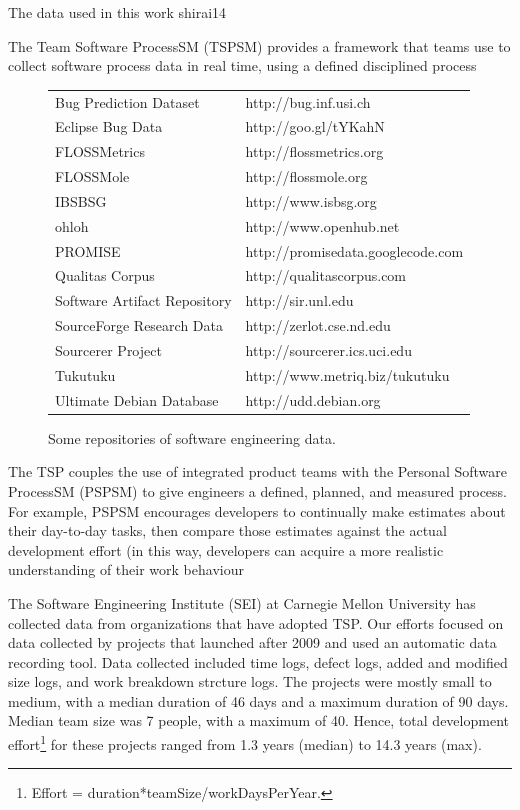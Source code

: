 \documentclass{sig-alternate}
\begin{document}
The data used in this work shirai14

The Team Software ProcessSM (TSPSM) provides a
framework that teams use to collect software process data in real
time, using a defined disciplined process


\begin{figure}
\begin{center}
\scriptsize\begin{tabular}{|l@{~:~}l|}\hline
Bug Prediction Dataset &http://bug.inf.usi.ch \\
Eclipse Bug Data &http://goo.gl/tYKahN \\
FLOSSMetrics& http://flossmetrics.org \\
FLOSSMole &http://flossmole.org \\
IBSBSG& http://www.isbsg.org \\
ohloh& http://www.openhub.net \\
PROMISE &http://promisedata.googlecode.com \\
Qualitas Corpus &http://qualitascorpus.com \\
Software Artifact Repository &http://sir.unl.edu \\
SourceForge Research Data &http://zerlot.cse.nd.edu \\
Sourcerer Project &http://sourcerer.ics.uci.edu \\
Tukutuku &http://www.metriq.biz/tukutuku \\
Ultimate Debian Database &http://udd.debian.org\\\hline
\end{tabular}
\end{center}
\caption{Some repositories of software engineering data.}\label{fig:sedata}
\end{figure}

The TSP couples
the use of integrated product teams with the Personal Software
ProcessSM (PSPSM) to give engineers a defined, planned, and
measured process. For example, PSPSM encourages developers to continually make estimates
about their day-to-day tasks, then compare those estimates against the actual development effort
(in this way, developers can acquire a more realistic understanding of their work behaviour

The Software Engineering Institute (SEI) at
Carnegie Mellon University has collected data from organizations
that have adopted TSP. 
Our efforts focused on data collected by projects that launched
after 2009 and used an automatic data recording tool. 
Data collected included time logs, defect
logs, added and modified size logs, and work
breakdown strcture logs.
The projects
were mostly small to medium, with a median duration of 46 days
and a maximum duration of 90 days. Median team size was 7
people, with a maximum of 40. Hence,  total development 
effort\footnote{
Effort =  duration*teamSize/workDaysPerYear.} for
these projects ranged from 1.3 years (median) to 14.3 years (max).
\end{document}
